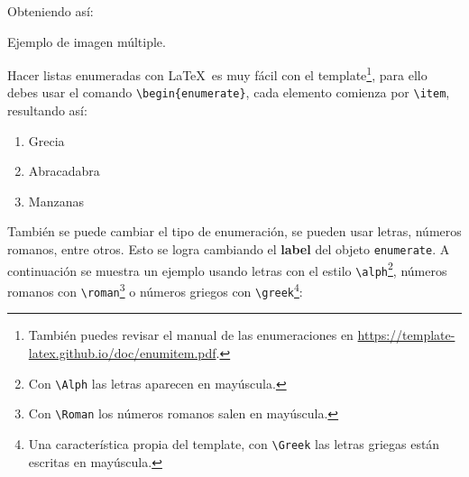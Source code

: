 	Obteniendo así: \\

	\begin{images}{Ejemplo de imagen múltiple.}
		\imagesnewline
	\end{images}


\clearpage
{}


	Hacer listas enumeradas con \LaTeX\ es muy fácil con el template\footnote{También puedes revisar el manual de las enumeraciones en \url{https://template-latex.github.io/doc/enumitem.pdf}.}, para ello debes usar el comando \texttt{\textbackslash begin\{enumerate\}}, cada elemento comienza por \texttt{\textbackslash item}, resultando así:

	\begin{enumerate}
		\item Grecia
		\item Abracadabra
		\item Manzanas
	\end{enumerate}

	También se puede cambiar el tipo de enumeración, se pueden usar letras, números romanos, entre otros. Esto se logra cambiando el \textbf{label} del objeto \texttt{enumerate}. A continuación se muestra un ejemplo usando letras con el estilo \texttt{\textbackslash alph}\footnote{Con \texttt{\textbackslash Alph} las letras aparecen en mayúscula.}, números romanos con \texttt{\textbackslash roman}\footnote{Con \texttt{\textbackslash Roman} los números romanos salen en mayúscula.} o números griegos con \texttt{\textbackslash greek}\footnote{Una característica propia del template, con \texttt{\textbackslash Greek} las letras griegas están escritas en mayúscula.}:

